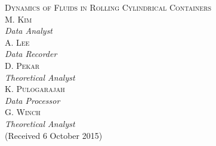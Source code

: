 \documentclass[12pt,twoside]{article}
\begin{document}
	\thispagestyle{empty}
	\pagestyle{fancy}
	\cfoot{}
	\renewcommand{\headrulewidth}{0pt}
	\lhead[\thepage]{}
	\rhead[]{\thepage}
	
	\begin{center} %
		\LARGE %
		\textsc{Dynamics of Fluids in Rolling Cylindrical Containers}\\
		
		\normalsize %
		\vspace{5mm}
		\textsc{M. Kim}\\
		\textit{\scriptsize Data Analyst}\\
		\textsc{A. Lee}\\
		\textit{\scriptsize Data Recorder}\\
		\textsc{D. Pekar}\\
		\textit{\scriptsize Theoretical Analyst}\\
		\textsc{K. Pulogarajah}\\
		\textit{\scriptsize Data Processor}\\
		\textsc{G. Winch}\\
		\textit{\scriptsize Theoretical Analyst}\\
		\vspace{3mm}
		\scriptsize %
		(Received 6 October 2015)\\
	\end{center}
	
	\begin{quotation} %
		\scriptsize
		\blindtext
	\end{quotation}
	
\end{document}
